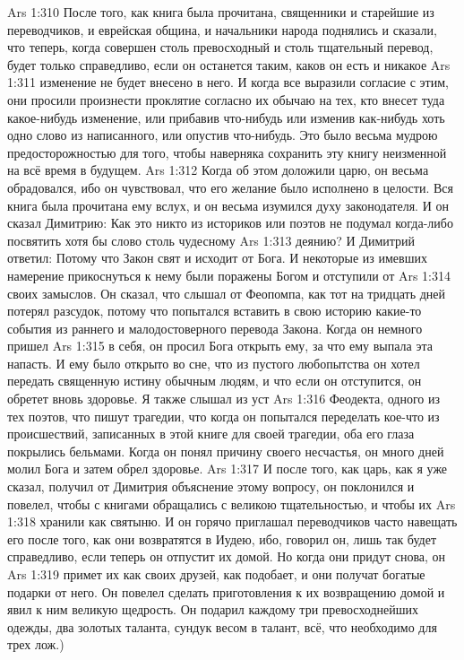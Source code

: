 \vs Ars 1:310
После того, как книга была прочитана, священники и старейшие из переводчиков, и еврейская община, и начальники народа поднялись и сказали, что теперь, когда совершен столь превосходный и столь тщательный перевод, будет только справедливо, если он останется таким, каков он есть и никакое
\vs Ars 1:311
изменение не будет внесено в него. И когда все выразили согласие с этим, они просили произнести проклятие согласно их обычаю на тех, кто внесет туда какое-нибудь изменение, или прибавив что-нибудь или изменив как-нибудь хоть одно слово из написанного, или опустив что-нибудь. Это было весьма мудрою предосторожностью для того, чтобы наверняка сохранить эту книгу неизменной на всё время в будущем.
\vs Ars 1:312
Когда об этом доложили царю, он весьма обрадовался, ибо он чувствовал, что его желание было исполнено в целости. Вся книга была прочитана ему вслух, и он весьма изумился духу законодателя. И он сказал Димитрию: Как это никто из историков или поэтов не подумал когда-либо посвятить хотя бы слово столь чудесному
\vs Ars 1:313
деянию? И Димитрий ответил: Потому что Закон свят и исходит от Бога. И некоторые из имевших намерение прикоснуться к нему были поражены Богом и отступили от
\vs Ars 1:314
своих замыслов. Он сказал, что слышал от Феопомпа, как тот на тридцать дней потерял разсудок, потому что попытался вставить в свою историю какие-то события из раннего и малодостоверного перевода Закона. Когда он немного пришел
\vs Ars 1:315
в себя, он просил Бога открыть ему, за что ему выпала эта напасть. И ему было открыто во сне, что из пустого любопытства он хотел передать священную истину обычным людям, и что если он отступится, он обретет вновь здоровье. Я также слышал из уст
\vs Ars 1:316
Феодекта, одного из тех поэтов, что пишут трагедии, что когда он попытался переделать кое-что из происшествий, записанных в этой книге для своей трагедии, оба его глаза покрылись бельмами. Когда он понял причину своего несчастья, он много дней молил Бога и затем обрел здоровье.
\vs Ars 1:317
И после того, как царь, как я уже сказал, получил от Димитрия объяснение этому вопросу, он поклонился и повелел, чтобы с книгами обращались с великою тщательностью, и чтобы их
\vs Ars 1:318
хранили как святыню. И он горячо приглашал переводчиков часто навещать его после того, как они возвратятся в Иудею, ибо, говорил он, лишь так будет справедливо, если теперь он отпустит их домой. Но когда они придут снова, он
\vs Ars 1:319
примет их как своих друзей, как подобает, и они получат богатые подарки от него. Он повелел сделать приготовления к их возвращению домой и явил к ним великую щедрость. Он подарил каждому три превосходнейших одежды, два золотых таланта, сундук весом в талант, всё, что необходимо для трех лож.)
